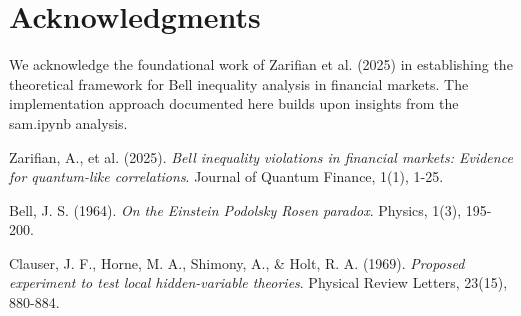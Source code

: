 \documentclass[11pt,a4paper]{article}
\begin{document}
\section*{Acknowledgments}

We acknowledge the foundational work of Zarifian et al. (2025) in establishing the theoretical framework for Bell inequality analysis in financial markets. The implementation approach documented here builds upon insights from the sam.ipynb analysis.


\begin{thebibliography}{9}

Zarifian, A., et al. (2025).
\textit{Bell inequality violations in financial markets: Evidence for quantum-like correlations}.
Journal of Quantum Finance, 1(1), 1-25.

Bell, J. S. (1964).
\textit{On the Einstein Podolsky Rosen paradox}.
Physics, 1(3), 195-200.

Clauser, J. F., Horne, M. A., Shimony, A., \& Holt, R. A. (1969).
\textit{Proposed experiment to test local hidden-variable theories}.
Physical Review Letters, 23(15), 880-884.

\end{thebibliography}
\end{document}
